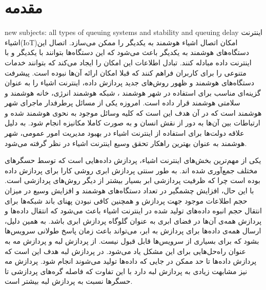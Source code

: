 
\chapter{مقدمه}
  \thispagestyle{empty}
    new subjects: all types of queuing systems and stability and queuing delay
    اینترنت اشیاء(IoT)امکان اتصال اشیاء هوشمند به یکدیگر را ممکن می‌سازد.
    اتصال این دستگاه‌های هوشمند به یکدیگر باعث می‌شود که این دستگاه‌ها بتوانند با یکدیگر و با اینترنت داده مبادله کنند.
    تبادل اطلاعات این امکان را ایجاد می‌کند که بتوانند خدمات متنوعی را برای کاربران فراهم کنند که قبلا امکان ارائه آن‌ها نبوده است.
    پیشرفت دستگاه‌های هوشمند و ظهور روش‌های جدید پردازش داده، اینترنت اشیاء را به عنوان گزینه‌ای مناسب برای استفاده در شهر هوشمند ، شبکه هوشمند انرژی، خانه هوشمند و سلامتی هوشمند قرار داده است.
    امروزه یکی از مسائل پرطرفدار ماجرای شهر هوشمند است که در آن هدف این است که کلیه وسائل موجود به نحوی هوشمند شده و ارتباطات بین آن‌ها به دور از نقش انسان و به صورت کاملا مکانیزه انجام شود.
    به دلیل علاقه دولت‌‌ها برای استفاده از اینترنت اشیاء در بهبود مدیریت امور عمومی، شهر هوشمند به عنوان بهترین راهکار تحقق وسیع اینترنت اشیاء در نظر گرفته می‌شود.

    یکی از مهم‌ترین بخش‌های اینترنت اشیاء، پردازش داده‌هایی است که توسط حسگر‌های مختلف جمع‌آوری شده‌ اند.
    به طور سنتی پردازش ابری روشی کارا برای پردازش داده بوده است چرا که ظرفیت پردازشی ابر بسیار بیشتر از دیگر روش‌های پردازشی است.
    با این حال، افزایش چشمگیر در تعداد دستگاه‌های هوشمند و افزایش وسیع در میزان حجم اطلاعات موجود جهت پردازش و همچنین کافی نبودن پهنای باند شبکه‌ها برای انتقال حجم انبوه داده‌های تولید شده در اینترنت اشیاء باعث می‌شود که انتقال داده‌ها و پردازش همه‌ی آن‌ها در فضای ابری به عنوان گلوگاه پردازش ابری باشد.
    به همین دلیل، ارسال همه‌ی داده‌ها برای پردازش به ابر، می‌تواند باعث زمان پاسخ طولانی سرویس‌ها بشود که برای بسیاری از سرویس‌ها قابل قبول نیست.
    از پردازش لبه و پردازش مه به عنوان راه‌حل‌هایی برای این مشکل یاد می‌شود.
    در پردازش لبه هدف این است که پردازش داده‌ها تا حد ممکن در جایی که داده‌ها تولید می‌شوند انجام شود.
    پردازش مه نیز مشابهت زیادی به پردازش لبه دارد با این تفاوت که فاصله گره‌های پردازشی تا حسگرها نسبت به پردازش لبه بیشتر است. 

